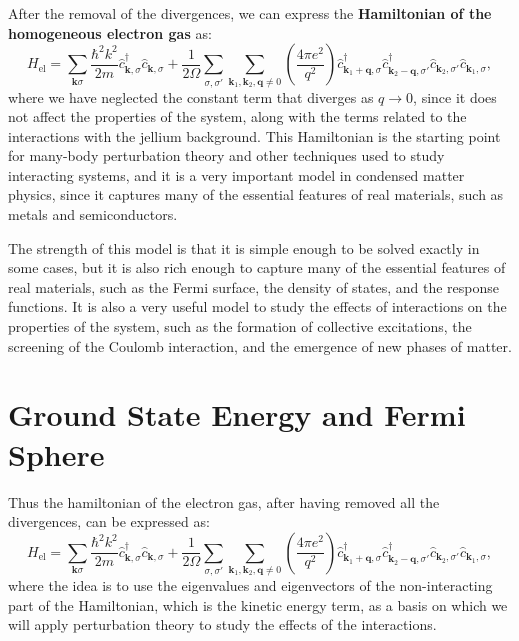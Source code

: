 After the removal of the divergences, we can express the \textbf{Hamiltonian of the homogeneous electron gas} as:
\[
    H_{\text{el}} = \sum_{\mathbf{k} \sigma} \frac{\hbar^2 k^2}{2m} \hat{c}_{\mathbf{k}, \sigma}^\dagger \hat{c}_{\mathbf{k}, \sigma} + \frac{1}{2\Omega} \sum_{\sigma, \sigma'} \sum_{\mathbf{k}_1, \mathbf{k}_2, \mathbf{q}\neq 0} \left( \frac{4 \pi e^2}{q^2} \right) \hat{c}_{\mathbf{k}_1 + \mathbf{q}, \sigma}^\dagger \hat{c}_{\mathbf{k}_2 - \mathbf{q}, \sigma'}^\dagger \hat{c}_{\mathbf{k}_2, \sigma'} \hat{c}_{\mathbf{k}_1, \sigma},
\]
where we have neglected the constant term that diverges as \(q \to 0\), since it does not affect the properties of the system, along with the terms related to the interactions with the jellium background. This Hamiltonian is the starting point for many-body perturbation theory and other techniques used to study interacting systems, and it is a very important model in condensed matter physics, since it captures many of the essential features of real materials, such as metals and semiconductors.

The strength of this model is that it is simple enough to be solved exactly in some cases, but it is also rich enough to capture many of the essential features of real materials, such as the Fermi surface, the density of states, and the response functions. It is also a very useful model to study the effects of interactions on the properties of the system, such as the formation of collective excitations, the screening of the Coulomb interaction, and the emergence of new phases of matter.

\section{Ground State Energy and Fermi Sphere}

Thus the hamiltonian of the electron gas, after having removed all the divergences, can be expressed as:
\[
    H_{\text{el}} = \sum_{\mathbf{k} \sigma} \frac{\hbar^2 k^2}{2m} \hat{c}_{\mathbf{k}, \sigma}^\dagger \hat{c}_{\mathbf{k}, \sigma} + \frac{1}{2\Omega} \sum_{\sigma, \sigma'} \sum_{\mathbf{k}_1, \mathbf{k}_2, \mathbf{q}\neq 0} \left( \frac{4 \pi e^2}{q^2} \right) \hat{c}_{\mathbf{k}_1 + \mathbf{q}, \sigma}^\dagger \hat{c}_{\mathbf{k}_2 - \mathbf{q}, \sigma'}^\dagger \hat{c}_{\mathbf{k}_2, \sigma'} \hat{c}_{\mathbf{k}_1, \sigma},
\]
where the idea is to use the eigenvalues and eigenvectors of the non-interacting part of the Hamiltonian, which is the kinetic energy term, as a basis on which we will apply perturbation theory to study the effects of the interactions.

